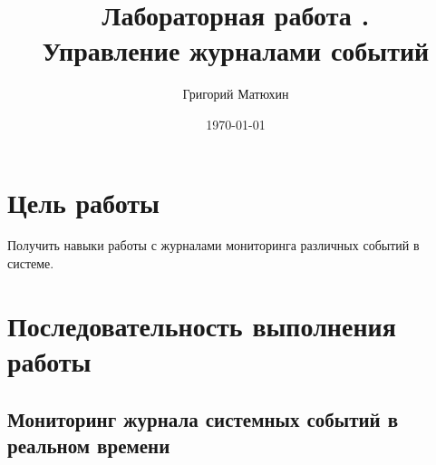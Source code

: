 \documentclass[12pt]{article}
\author{Григорий Матюхин}
\date{\today}
\title{Лабораторная работа \textnumero7.\\Управление журналами событий}
\begin{document}
\maketitle
\newpage
\tableofcontents
\newpage
\section{Цель работы}
Получить навыки работы с журналами мониторинга различных событий в системе.

\section{Последовательность выполнения работы}

\subsection{Мониторинг журнала системных событий в реальном времени}
\end{document}

